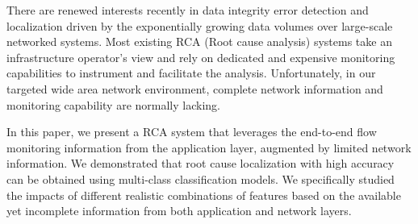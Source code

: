 There are renewed interests recently in data integrity error detection and localization driven by the exponentially growing data volumes 
over large-scale networked systems. Most existing RCA (Root cause analysis) systems take an infrastructure operator's view and rely on 
dedicated and expensive monitoring capabilities to instrument and facilitate the analysis. Unfortunately, in our targeted wide area network 
environment, complete network information and monitoring capability are normally lacking. 

In this paper, we present a RCA system that leverages the end-to-end flow monitoring information 
from the application layer, augmented by limited network information. We demonstrated that root cause localization with high accuracy 
can be obtained using multi-class classification models. We specifically studied the 
impacts of different realistic combinations of features based on the available yet incomplete information from both application and 
network layers. 

